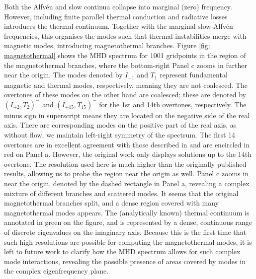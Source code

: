Both the Alfv\'en and slow continua collapse into marginal (zero) frequency. However, including finite parallel thermal conduction and radiative losses introduces the thermal continuum. Together with the marginal slow-Alfv\'en frequencies, this organises the modes such that thermal instabilities merge with magnetic modes, introducing magnetothermal branches. Figure \ref{fig: magnetothermal} shows the MHD spectrum for 1001 gridpoints in the region of the magnetothermal branches, where the bottom-right Panel c zooms in further near the origin. The modes denoted by $I_{+1}$ and $T_1$ represent fundamental magnetic and thermal modes, respectively, meaning they are not coalesced.
The overtones of these modes on the other hand are coalesced; these are denoted by $\left(I_{+2}, T_2\right)^-$ and $\left(I_{+15}, T_{15}\right)^-$ for the 1st and 14th overtones, respectively. The minus sign in superscript means they are located on the negative side of the real axis. There are corresponding modes on the positive part of the real axis, as without flow, we maintain left-right symmetry of the spectrum. The first 14 overtones are in excellent agreement with those described in \citet{vanderlinden1992} and are encircled in red on Panel a. However, the original work only displays solutions up to the 14th overtone. The resolution used here is much higher than the originally published results, allowing us to probe the region near the origin as well. Panel c zooms in near the origin, denoted by the dashed rectangle in Panel a, revealing a complex mixture of different branches and scattered modes. It seems that the original magnetothermal branches split, and a dense region covered with many magnetothermal modes appears. The (analytically known) thermal continuum is annotated in green on the figure, and is represented by a dense, continuous range of discrete eigenvalues on the imaginary axis. Because this is the first time that such high resolutions are possible for computing the magnetothermal modes, it is left to future work to clarify how the MHD spectrum allows for such complex mode interactions, revealing the possible presence of areas covered by modes in the complex eigenfrequency plane.


